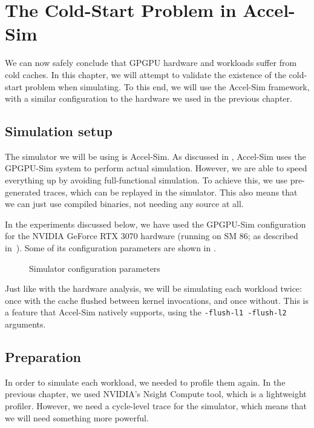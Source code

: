\chapter{The Cold-Start Problem in Accel-Sim}\label{ch:sim-analysis}

We can now safely conclude that GPGPU hardware and workloads suffer from cold caches.
In this chapter, we will attempt to validate the existence of the cold-start problem when simulating.
To this end, we will use the Accel-Sim framework, with a similar configuration to the hardware we used in the previous chapter.

\section{Simulation setup}\label{sec:simulation-setup}
The simulator we will be using is Accel-Sim\cite{accelsim}.
As discussed in , Accel-Sim uses the GPGPU-Sim\cite{gpgpu-sim} system to perform actual simulation.
However, we are able to speed everything up by avoiding full-functional simulation.
To achieve this, we use pre-generated traces, which can be replayed in the simulator.
This also means that we can just use compiled binaries, not needing any source at all.

In the experiments discussed below, we have used the GPGPU-Sim configuration for the NVIDIA GeForce RTX 3070 hardware (running on SM 86; as described in\ \cite{nvidia-wp}).
Some of its configuration parameters are shown in .

\begin{figure}[ht]
    \centering
    
    \caption{Simulator configuration parameters}
    \label{fig:sim_config}
\end{figure}

Just like with the hardware analysis, we will be simulating each workload twice: once with the cache flushed between kernel invocations, and once without.
This is a feature that Accel-Sim natively supports, using the \verb|-flush-l1 -flush-l2| arguments.

\FloatBarrier
\section{Preparation}\label{sec:preparation}
In order to simulate each workload, we needed to profile them again.
In the previous chapter, we used NVIDIA's Nsight Compute tool, which is a lightweight profiler.
However, we need a cycle-level trace for the simulator, which means that we will need something more powerful.

